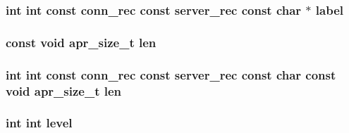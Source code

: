 \subsubsection[{\texorpdfstring{label}{label}}]{ {\bf int} {\bf int} const {\bf conn\+\_\+rec} const {\bf server\+\_\+rec} const char $\ast$ label}\hypertarget{group__APACHE__CORE__LOG_ga0b7ff30caa1d4032dc5e6422f35b7485}{}\label{group__APACHE__CORE__LOG_ga0b7ff30caa1d4032dc5e6422f35b7485}
\subsubsection[{\texorpdfstring{len}{len}}]{\setlength{\rightskip}{0pt plus 5cm}const {\bf void} {\bf apr\+\_\+size\+\_\+t} len}\hypertarget{group__APACHE__CORE__LOG_gab5a43233d60ef05c5b5bf5cba3d74468}{}\label{group__APACHE__CORE__LOG_gab5a43233d60ef05c5b5bf5cba3d74468}
\subsubsection[{\texorpdfstring{len}{len}}]{ {\bf int} {\bf int} const {\bf conn\+\_\+rec} const {\bf server\+\_\+rec} const char const {\bf void} {\bf apr\+\_\+size\+\_\+t} len}\hypertarget{group__APACHE__CORE__LOG_ga81aaf8f11747fd23d6595b883debbf70}{}\label{group__APACHE__CORE__LOG_ga81aaf8f11747fd23d6595b883debbf70}
\subsubsection[{\texorpdfstring{level}{level}}]{ {\bf int} {\bf int} level}\hypertarget{group__APACHE__CORE__LOG_ga46c1c4bc138aad1e20504bbee34f35a7}{}\label{group__APACHE__CORE__LOG_ga46c1c4bc138aad1e20504bbee34f35a7}
